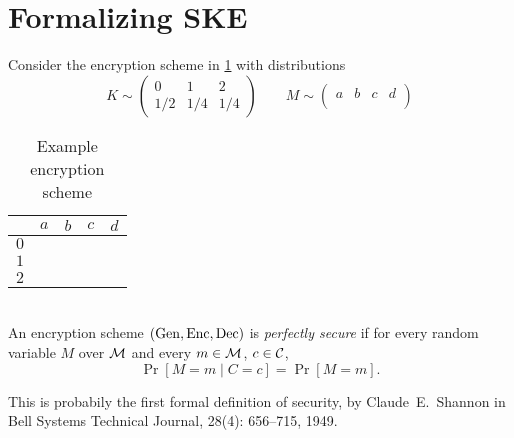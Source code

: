 \section{Formalizing SKE} \label{sec:formalizing-ske}

\begin{exercise}
    Consider the encryption scheme in \cref{tab:enc1}
    with distributions \[
        K \sim \begin{pmatrix}
            0 & 1 & 2 \\
            1/2 & 1/4 & 1/4
        \end{pmatrix} \qquad
        M \sim \begin{pmatrix}
            a & b & c & d \\
             &  &  & 
        \end{pmatrix}
    \]
\end{exercise}
\begin{table}
    \centering
    \begin{tabular}{ccccc}
        \toprule
        & $a$ & $b$ & $c$ & $d$ \\
        \midrule
        $0$ & \\
        $1$ & \\
        $2$ & \\
        \bottomrule
    \end{tabular}
    \caption{Example encryption scheme}
    \label{tab:enc1}
\end{table}

\begin{definition*} \label{def:ske:perfect}
    \;\\
    An encryption scheme $(\operatorname{Gen}, \operatorname{Enc}, \operatorname{Dec})$ is \emph{perfectly secure}
    if for every random variable $M$ over $\mathcal{M}$ and
    every $m \in \mathcal{M}$, $c \in \mathcal{C}$, \[
        \Pr[M = m \mid C = c] = \Pr[M = m].
    \]
\end{definition*}
\begin{remark}
    This is probabily the first formal definition of security,
    by Claude~E.~Shannon in
    Bell Systems Technical Journal, 28(4): 656--715, 1949.
\end{remark}

